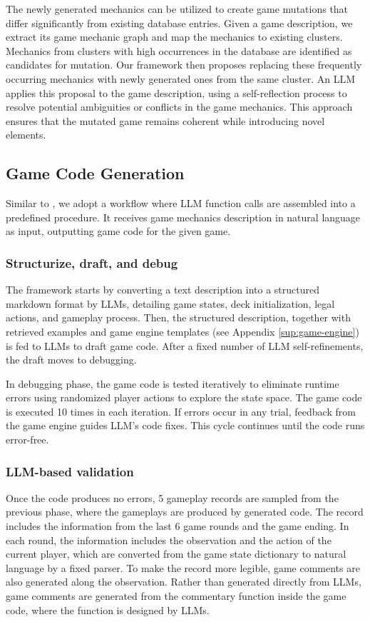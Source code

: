The newly generated mechanics can be utilized to create game mutations that differ significantly from existing database entries. Given a game description, we extract its game mechanic graph and map the mechanics to existing clusters. Mechanics from clusters with high occurrences in the database are identified as candidates for mutation. Our framework then proposes replacing these frequently occurring mechanics with newly generated ones from the same cluster. An LLM applies this proposal to the game description, using a self-reflection process to resolve potential ambiguities or conflicts in the game mechanics. This approach ensures that the mutated game remains coherent while introducing novel elements.

\subsection{Game Code Generation}
\label{sec:game-code}
\label{sec:codedraft}
\label{sec:debug}

Similar to \cite{agentless}, we adopt a workflow where LLM function calls are assembled into a predefined procedure. It receives game mechanics description in natural language as input, outputting game code for the given game. 

\subsubsection{Structurize, draft, and debug}

The framework starts by converting a text description into a structured markdown format by LLMs, detailing game states, deck initialization, legal actions, and gameplay process. Then, the structured description, together with retrieved examples and game engine templates (see Appendix \ref{sup:game-engine}) is fed to LLMs to draft game code. After a fixed number of LLM self-refinements, the draft moves to debugging.

In debugging phase, the game code is tested iteratively to eliminate runtime errors using randomized player actions to explore the state space. The game code is executed 10 times in each iteration. If errors occur in any trial, feedback from the game engine guides LLM's code fixes. This cycle continues until the code runs error-free.


\subsubsection{LLM-based validation}
\label{sec:validate}
Once the code produces no errors, 5 gameplay records are sampled from the previous phase, where the gameplays are produced by generated code. The record includes the information from the last 6 game rounds and the game ending. In each round, the information includes the observation and the action of the current player, which are converted from the game state dictionary to natural language by a fixed parser. To make the record more legible, game comments are also generated along the observation. Rather than generated directly from LLMs, game comments are generated from the commentary function inside the game code, where the function is designed by LLMs. 

